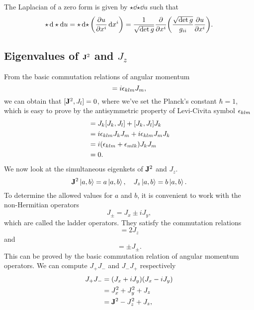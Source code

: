 \documentclass[10pt]{article}
\begin{document}
	The Laplacian of a zero form is given by $\star\dd{\star\dd{u}}$ such that
	\begin{equation}
		\star\dd{\star\dd{u}} = \star\dd{\star} \pqty{\pdv{u}{x^i} \dd{x^i}} \\
		= \frac{1}{\sqrt{\det g}} \pdv{x^i} \pqty{\frac{\sqrt{\det g}}{g_{ii}} \pdv{u}{x^i}}.
	\end{equation}

	\subsection{Eigenvalues of ${\bf J}^2$ and $J_z$}

	From the basic commutation relations of angular momentum
	\begin{equation}
		[J_k, J_l] = i \eps_{klm} J_m,
	\end{equation}
	we can obtain that $[{\bf J}^2, J_l] = 0$, where we've set the Planck's constant $\hbar = 1$, which is easy to prove by the antisymmetric property of Levi-Civita symbol $\epsilon_{klm}$
	\begin{align*}
		[\bfJ^2, J_l] &= J_k [J_k, J_l] + [J_k, J_l] J_k \\
		&= i \eps_{klm} J_k J_m + i \eps_{klm} J_m J_k \\
		&= i (\eps_{klm} + \eps_{mlk}) J_k J_m \\
		&= 0.
	\end{align*}
	We now look at the simultaneous eigenkets of ${\bf J}^2$ and $J_z$.
	\begin{equation}
		{\bf J}^2 \ket{a,b} = a \ket{a,b}, \quad J_z \ket{a,b} = b \ket{a,b}.
	\end{equation}
	To determine the allowed values for $a$ and $b$, it is convenient to work with the non-Hermitian operators
	\begin{equation}
		J_{\pm} = J_x \pm i J_y,
	\end{equation}
	which are called the ladder operators. They satisfy the commutation relations
	\begin{equation}
		[J_+, J_-] = 2 J_z
	\end{equation}
	and
	\begin{equation}
		[J_z, J_{\pm}] = \pm J_{\pm}.
	\end{equation}
	This can be proved by the basic commutation relation of angular momentum operators. We can compute $J_+ J_-$ and $J_- J_+$ respectively
	\begin{align*}
		J_{+} J_{-} &= (J_x + i J_y) (J_x - i J_y) \\
		&= J_x^2 + J_y^2  + J_z \\
		&= {\bf J}^2 - J_z^2 + J_z,
	\end{align*}
\end{document}
